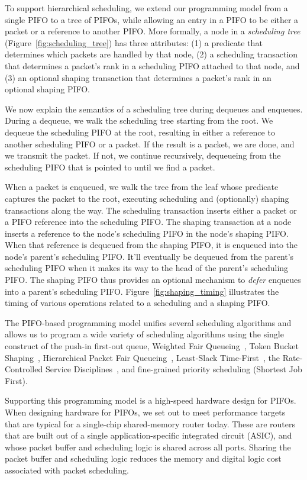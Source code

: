 To support hierarchical scheduling, we extend our programming model from a
single PIFO to a tree of PIFOs, while allowing an entry in a PIFO to be either
a packet or a reference to another PIFO. More formally, a node in a {\em scheduling
tree} (Figure~\ref{fig:scheduling_tree}) has three attributes: (1) a predicate
that determines which packets are handled by that node, (2) a scheduling
transaction that determines a packet's rank in a scheduling PIFO attached to
that node, and (3) an optional shaping transaction that determines a packet's
rank in an optional shaping PIFO.

We now explain the semantics of a scheduling tree during dequeues and enqueues.
During a dequeue, we walk the scheduling tree starting from the root. We
dequeue the scheduling PIFO at the root, resulting in either a reference to
another scheduling PIFO or a packet. If the result is a packet, we are done,
and we transmit the packet. If not, we continue recursively, dequeueing from
the scheduling PIFO that is pointed to until we find a packet.

When a packet is enqueued, we walk the tree from the leaf whose predicate
captures the packet to the root, executing scheduling and (optionally) shaping
transactions along the way. The scheduling transaction inserts either a packet
or a PIFO reference into the scheduling PIFO. The shaping transaction at a node
inserts a reference to the node's scheduling PIFO in the node's shaping PIFO.
When that reference is dequeued from the shaping PIFO, it is enqueued into the
node's parent's scheduling PIFO. It'll eventually be dequeued from the parent's
scheduling PIFO when it makes its way to the head of the parent's scheduling
PIFO. The shaping PIFO thus provides an optional mechanism to {\em defer}
enqueues into a parent's scheduling PIFO. Figure~\ref{fig:shaping_timing}
illustrates the timing of various operations related to a scheduling and a
shaping PIFO.

The PIFO-based programming model unifies several scheduling algorithms and
allows us to program a wide variety of scheduling algorithms using the single
construct of the push-in first-out queue, \eg Weighted Fair
Queueing~\cite{wfq}, Token Bucket Shaping~\cite{tbf}, Hierarchical Packet
Fair Queueing~\cite{hpfq}, Least-Slack Time-First~\cite{lstf}, the
Rate-Controlled Service Disciplines~\cite{rcsd}, and fine-grained priority
scheduling (\eg Shortest Job First).

 Supporting this programming model is a high-speed
hardware design for PIFOs. When designing hardware for PIFOs, we set out to
meet performance targets that are typical for a single-chip shared-memory
router today. These are routers that are built out of a single
application-specific integrated circuit (ASIC), and whose packet buffer and
scheduling logic is shared across all ports. Sharing the packet buffer and
scheduling logic reduces the memory and digital logic cost associated with
packet scheduling.

